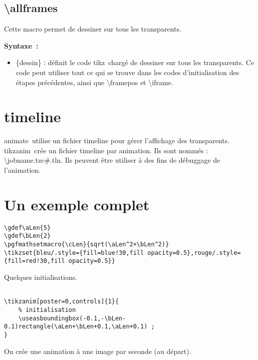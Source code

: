 \documentclass[a4paper,12pt]{article}
\newcommand\Tikz{{\ttfamily tikz}}
\newcommand\TikzAnimate{{\ttfamily tikzanim}}
\newcommand\Animate{{\ttfamily animate}}
\begin{document}
\subsection{\ttfamily\textbackslash allframes}

Cette macro permet de dessiner sur tous les transparents.

\textbf{Syntaxe~:}


	\begin{itemize}
		\item {\ttfamily\{dessin\}} : définit le code \Tikz\ chargé de dessiner sur tous les transparents. Ce code peut utiliser tout ce qui se trouve dans
		les codes d'initialisation des étapes précédentes, ainsi que {\ttfamily\textbackslash framepos} et {\ttfamily\textbackslash iframe}.
	\end{itemize}
	
\section{\ttfamily timeline}

\Animate\ utilise un fichier {\ttfamily timeline} pour gérer l'affichage des transparents. \TikzAnimate\ crée un fichier {\ttfamily timeline} par animation. Ils sont nommés : {\ttfamily \textbackslash jobname.tzc\#.tln}. Ils peuvent être utiliser à des fins de débuggage de l'animation.
	
\section{Un exemple complet}

\begin{lstlisting}[name=exemplecomplet]
\gdef\aLen{5}
\gdef\bLen{2}
\pgfmathsetmacro{\cLen}{sqrt(\aLen^2+\bLen^2)}
\tikzset{bleu/.style={fill=blue!30,fill opacity=0.5},rouge/.style={fill=red!30,fill opacity=0.5}} 
\end{lstlisting}

Quelques initialisations.


\begin{lstlisting}[name=exemplecomplet]

\tikzanim[poster=0,controls]{1}{
	% initialisation 
	\useasboundingbox(-0.1,-\bLen-0.1)rectangle(\aLen+\bLen+0.1,\aLen+0.1) ;
}
\end{lstlisting}
On crée une animation à une image par seconde (au départ).
\end{document}
